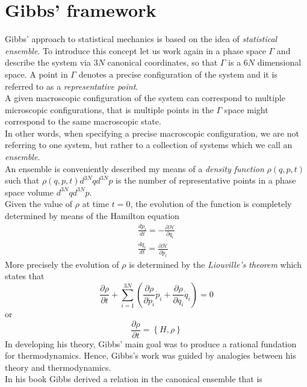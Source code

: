 \section{Gibbs' framework}
Gibbs' approach to statistical mechanics is based on the idea of \emph{statistical ensemble}. To introduce this concept
let us work again in a phase space $\Gamma$ and describe the system via $3N$ canonical coordinates, so that $\Gamma$ is a $6N$ dimensional space. A point in $\Gamma$ denotes
a precise configuration of the system and it is referred to as a \emph{representative point}. \\
A given macroscopic configuration of the system can correspond to multiple microscopic configurations, that is multiple points in the $\Gamma$ space might correspond to the same macroscopic state. \\
In other words, when specifying a precise macroscopic configuration, we are not referring to one system, but rather to a collection of systems which we call an \emph{ensemble}. \\
An ensemble is conveniently described my means of a \emph{density function} $\rho(q, p ,t)$ such that $\rho(q, p, t) d^{3N}qd^{3N}p$ is the number of representative points in a phase space volume $d^{3N}qd^{3N}p$. \\
Given the value of $\rho$ at time $t=0$, the evolution of the function is completely determined by means of the Hamilton equation 
\begin{gather*}
    \frac{dp_i}{dt} = -\frac{\partial \mathcal H}{\partial q_i} \\
    \frac{dq_i}{dt} = \frac{\partial \mathcal H}{\partial p_i}
\end{gather*}
More precisely the evolution of $\rho$ is determined by the \emph{Liouville's theorem} which states that
\begin{equation}
    \frac{\partial \rho}{\partial t} + \sum_{i=1}^{3N} \left(\frac{\partial \rho}{\partial p_i}\dot p_i + \frac{\partial \rho}{\partial q_i} \dot q_i\right) = 0
\end{equation}
or 
\begin{equation*}
    \frac{\partial \rho}{\partial t} = \left\{H, \rho\right\}
\end{equation*}
\vspace{10pt}
In developing his theory, Gibbs' main goal was to produce a rational fundation for thermodynamics. Hence, Gibbs's work was guided by analogies between his theory and thermodynamics. \\
In his book \cite{gibbs_2010} Gibbs derived a relation in the canonical ensemble that is
